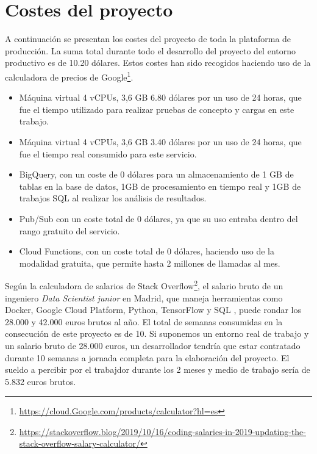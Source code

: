 \section{Costes del proyecto}\label{sec:costes-del-proyecto}
A continuación se presentan los costes del proyecto de toda la plataforma de producción.
La suma total durante todo el desarrollo del proyecto del entorno productivo es de 10.20 dólares.
Estos costes han sido recogidos haciendo uso de la calculadora de precios de Google\footnote{\url{https://cloud.Google.com/products/calculator?hl=es}}.

\begin{itemize}
    \item Máquina virtual 4 vCPUs, 3,6 GB 6.80 dólares por un uso de 24 horas, que fue el tiempo utilizado para realizar pruebas de concepto y cargas en este trabajo.
    \item Máquina virtual 4 vCPUs, 3,6 GB 3.40 dólares por un uso de 24 horas, que fue el tiempo real consumido para este servicio.
    \item BigQuery, con un coste de 0 dólares para un almacenamiento de 1 GB de tablas en la base de datos, 1GB de procesamiento en tiempo real y 1GB de trabajos SQL al realizar los análisis de resultados.
    \item Pub/Sub con un coste total de 0 dólares, ya que su uso entraba dentro del rango gratuito del servicio.
    \item Cloud Functions, con un coste total de 0 dólares, haciendo uso de la modalidad gratuita, que permite hasta 2 millones de llamadas al mes.
\end{itemize}

Según la calculadora de salarios de Stack Overflow\footnote{\url{https://stackoverflow.blog/2019/10/16/coding-salaries-in-2019-updating-the-stack-overflow-salary-calculator/}}, el salario bruto de un ingeniero \textit{Data Scientist} \textit{junior} en Madrid, que maneja herramientas como Docker, Google Cloud Platform, Python, TensorFlow y SQL , puede rondar los 28.000 y 42.000 euros brutos al año.
El total de semanas consumidas en la consecución de este proyecto es de 10.
Si suponemos un entorno real de trabajo y un salario bruto de 28.000 euros, un desarrollador tendría que estar contratado durante 10 semanas a jornada completa para la elaboración del proyecto.
El sueldo a percibir por el trabajdor durante los 2 meses y medio de trabajo sería de 5.832 euros brutos.
